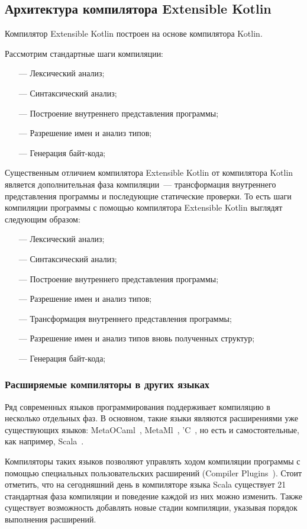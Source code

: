 \subsection{Архитектура компилятора Extensible Kotlin}\label{architecture}
Компилятор Extensible Kotlin построен на основе компилятора Kotlin.

Рассмотрим стандартные шаги компиляции:
\begin{itemize}
\item[---] Лексический анализ;
\item[---] Синтаксический анализ;
\item[---] Построение внутреннего представления программы;
\item[---] Разрешение имен и анализ типов;
\item[---] Генерация байт-кода;
\end{itemize}

Существенным отличием компилятора Extensible Kotlin от компилятора Kotlin является дополнительная фаза компиляции~--- трансформация внутреннего представления программы  и последующие статические проверки. То есть шаги компиляции программы с помощью компилятора Extensible Kotlin выглядят следующим образом:
\begin{itemize}
\item[---] Лексический анализ;
\item[---] Синтаксический анализ;
\item[---] Построение внутреннего представления программы;
\item[---] Разрешение имен и анализ типов;
\item[---] Трансформация внутреннего представления программы;
\item[---] Разрешение имен и анализ типов вновь полученных структур;
\item[---] Генерация байт-кода;
\end{itemize}

\subsubsection{Расширяемые компиляторы в других языках} %
Ряд современных языков программирования поддерживает компиляцию в несколько отдельных фаз.
В основном, такие языки являются расширениями уже существующих языков: MetaOCaml~\cite{metaocaml}, MetaMl~\cite{metaml}, 'C~\cite{extendible-c}, но есть и самостоятельные, как например, Scala~\cite{scala-spec}. 

Компиляторы таких языков позволяют управлять ходом компиляции программы с помощью специальных пользовательских расширений (Compiler Plugins~\cite{scala-compiler-plugin}). Стоит отметить, что на сегодняшний день в компиляторе языка Scala существует 21 стандартная фаза компиляции и поведение каждой из них можно изменить. Также существует возможность добавлять новые стадии компиляции, указывая порядок выполнения расширений.

